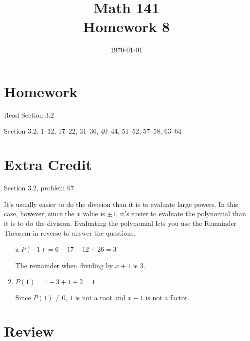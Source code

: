 \documentclass{exam}
\date{\today}
\author{}
\title{Math 141 \\ Homework 8}
\begin{document}
  \maketitle

  \section{Homework}

  \begin{itemize*}
    \item Read Section 3.2
    \item Section 3.2: 1--12, 17--22, 31--36, 40--44, 51--52, 57--58, 63--64
  \end{itemize*}

  \section{Extra Credit}
  Section 3.2, problem 67

  \ifprintanswers{}
    \begin{solution}
      It's usually easier to do the division than it is to evaluate large powers.  In this case, however, since the $x$
      value is $\pm 1$, it's easier to evaluate the polynomial than it is to do the division.  Evaluating the polynomial
      lets you use the {Remainder Theorem} in reverse to answer the questions.

      \begin{enumerate}[a]
        \item[a] 
          $P(-1) = 6 - 17 - 12 + 26 = 3$

          The remainder when dividing by $x + 1$ is 3.

        \item
          $P(1) = 1 - 3 + 1 + 2 = 1$

          Since $P(1) \neq 0$, $1$ is not a root and $x - 1$ is not a factor.

      \end{enumerate}

    \end{solution}

  \fi

  \section{Review}
\end{document}
